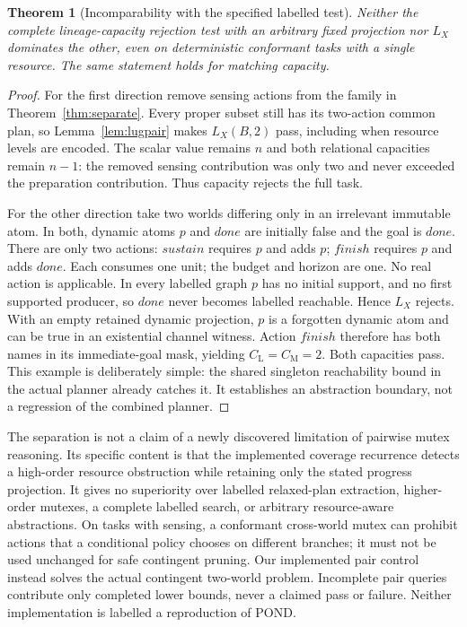 \documentclass[11pt]{article}
\newtheorem{theorem}{Theorem}[section]
\theoremstyle{definition}
\newcommand{\CL}{C_{\mathrm L}}
\newcommand{\CM}{C_{\mathrm M}}
\begin{document}
\begin{theorem}[Incomparability with the specified labelled test]\label{thm:lug}
Neither the complete lineage-capacity rejection test with an arbitrary fixed
projection nor $L_X$ dominates the other, even on deterministic conformant tasks
with a single resource. The same statement holds for matching capacity.
\end{theorem}
\begin{proof}
For the first direction remove sensing actions from the family in
Theorem~\ref{thm:separate}. Every proper subset still has its two-action common
plan, so Lemma~\ref{lem:lugpair} makes $L_X(B,2)$ pass, including when resource
levels are encoded. The scalar value remains $n$ and both relational capacities
remain $n-1$: the removed sensing contribution was only two and never exceeded
the preparation contribution. Thus capacity rejects the full task.

For the other direction take two worlds differing only in an irrelevant
immutable atom. In both, dynamic atoms $p$ and $done$ are initially false and
the goal is $done$. There are only two actions: $sustain$ requires $p$ and adds
$p$; $finish$ requires $p$ and adds $done$. Each consumes one unit; the budget
and horizon are one. No real action is applicable. In every labelled graph
$p$ has no initial support, and no first supported producer, so $done$ never
becomes labelled reachable. Hence $L_X$ rejects. With an empty retained dynamic
projection, $p$ is a forgotten dynamic atom and can be true in an existential
channel witness. Action $finish$ therefore has both names in its immediate-goal
mask, yielding $\CL=\CM=2$. Both capacities pass. This example is deliberately
simple: the shared singleton reachability bound in the actual planner already
catches it. It establishes an abstraction boundary, not a regression of the
combined planner.
\end{proof}

The separation is not a claim of a newly discovered limitation of pairwise
mutex reasoning. Its specific content is that the implemented coverage
recurrence detects a high-order resource obstruction while retaining only the
stated progress projection. It gives no superiority over labelled relaxed-plan
extraction, higher-order mutexes, a complete labelled search, or arbitrary
resource-aware abstractions. On tasks with sensing, a conformant cross-world
mutex can prohibit actions that a conditional policy chooses on different
branches; it must not be used unchanged for safe contingent pruning. Our
implemented pair control instead solves the actual contingent two-world problem.
Incomplete pair queries contribute only completed lower bounds, never a claimed
pass or failure. Neither implementation is labelled a reproduction of POND.
\end{document}
